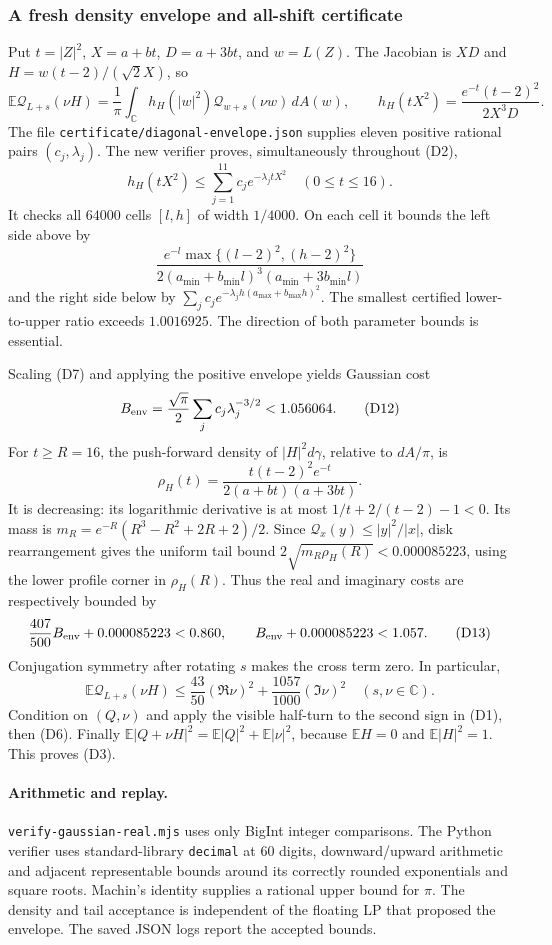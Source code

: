 \subsubsection{A fresh density envelope and all-shift certificate}
Put $t=|Z|^2$, $X=a+bt$, $D=a+3bt$, and $w=L(Z)$.
The Jacobian is $XD$ and $H=w(t-2)/(\sqrt2 X)$, so
\[
 \mathbb E\mathcal Q_{L+s}(\nu H)
 =\frac1\pi\int_{\mathbb C}h_H(|w|^2)
      \mathcal Q_{w+s}(\nu w)\,dA(w),\qquad
 h_H(tX^2)=\frac{e^{-t}(t-2)^2}{2X^3D}.
 \tag{D10}
\]
The file \texttt{certificate/diagonal-envelope.json} supplies eleven
positive rational pairs $(c_j,\lambda_j)$.
The new verifier proves, simultaneously throughout (D2),
\[
 h_H(tX^2)\le\sum_{j=1}^{11}c_j e^{-\lambda_j tX^2}
       \quad(0\le t\le16).
 \tag{D11}
\]
It checks all $64000$ cells $[l,h]$ of width $1/4000$.
On each cell it bounds the left side above by
\[
 \frac{e^{-l}\max\{(l-2)^2,(h-2)^2\}}
      {2(a_{\min}+b_{\min}l)^3(a_{\min}+3b_{\min}l)}
\]
and the right side below by
$\sum_j c_j e^{-\lambda_j h(a_{\max}+b_{\max}h)^2}$.
The smallest certified lower-to-upper ratio exceeds $1.0016925$.
The direction of both parameter bounds is essential.

Scaling (D7) and applying the positive envelope yields Gaussian cost
\[
 B_{\rm env}=\frac{\sqrt\pi}{2}
       \sum_j c_j\lambda_j^{-3/2}<1.056064.
 \tag{D12}
\]
For $t\ge R=16$, the push-forward density of $|H|^2d\gamma$,
relative to $dA/\pi$, is
\[
 \rho_H(t)=\frac{t(t-2)^2e^{-t}}{2(a+bt)(a+3bt)}.
\]
It is decreasing: its logarithmic derivative is at most
$1/t+2/(t-2)-1<0$. Its mass is
$m_R=e^{-R}(R^3-R^2+2R+2)/2$.
Since $\mathcal Q_x(y)\le|y|^2/|x|$, disk rearrangement gives the
uniform tail bound $2\sqrt{m_R\rho_H(R)}<0.000085223$,
using the lower profile corner in $\rho_H(R)$.
Thus the real and imaginary costs are respectively bounded by
\[
 \frac{407}{500}B_{\rm env}+0.000085223<0.860,\qquad
 B_{\rm env}+0.000085223<1.057.
 \tag{D13}
\]
Conjugation symmetry after rotating $s$ makes the cross term zero.
In particular,
\[
 \mathbb E\mathcal Q_{L+s}(\nu H)
 \le\frac{43}{50}(\Re\nu)^2+\frac{1057}{1000}(\Im\nu)^2
 \quad(s,\nu\in\mathbb C).
\]
Condition on $(Q,\nu)$ and apply the visible half-turn to the second
sign in (D1), then (D6). Finally
$\mathbb E|Q+\nu H|^2=\mathbb E|Q|^2+\mathbb E|\nu|^2$,
because $\mathbb EH=0$ and $\mathbb E|H|^2=1$.
This proves (D3).

\paragraph{Arithmetic and replay.}
\texttt{verify-gaussian-real.mjs} uses only BigInt integer comparisons.
The Python verifier uses standard-library \texttt{decimal} at 60 digits,
downward/upward arithmetic and adjacent
representable bounds around its correctly rounded exponentials and
square roots. Machin's identity supplies a rational upper bound for $\pi$.
The density and tail acceptance is independent of the floating LP that
proposed the envelope. The saved JSON logs report the accepted bounds.

